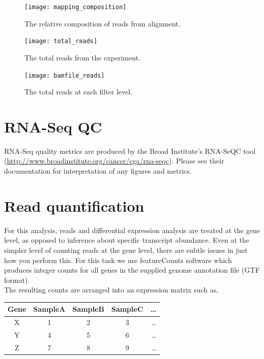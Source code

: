 \documentclass{article}
\begin{document}
{\begin{figure}[ht!]
  \centering
    \texttt{[image: mapping\_composition]}
    \caption{The relative composition of reads from alignment.}
    \label{fig:relative_composition}
\end{figure}

\begin{figure}[ht!]
  \centering
    \texttt{[image: total\_reads]}
    \caption{The total reads from the experiment.}
     \label{fig:total_counts}
\end{figure}

\begin{figure}[ht!]
  \centering
    \texttt{[image: bamfile\_reads]}
    \caption{The total reads at each filter level.}
     \label{fig:bam_level_counts}
\end{figure}

{%

\section{RNA-Seq QC}

RNA-Seq quality metrics are produced by the Broad Institute's RNA-SeQC tool \cite{rnaseqc} (\url{http://www.broadinstitute.org/cancer/cga/rna-seqc}).  Please see their documentation for interpretation of any figures and metrics.

\section{Read quantification}

For this analysis, reads and differential expression analysis are treated at the gene level, as opposed to inference about specific transcript abundance.  Even at the simpler level of counting reads at the gene level, there are subtle issues in just how you perform this.  For this task we use featureCounts software \cite{featureCounts} which produces integer counts for all genes in the supplied genome annotation file (GTF format).  \\

The resulting counts are arranged into an expression matrix such as,
\begin{center}
\begin{tabular}{c || c | c | c | r }
  Gene & SampleA & SampleB & SampleC & \ldots \\
  \hline			
  X & 1 & 2 & 3 & \ldots \\
  Y & 4 & 5 & 6 & \ldots\\
  Z & 7 & 8 & 9 & \ldots\\
  \hline  
\end{tabular}
\end{center}

}}
\end{document}
